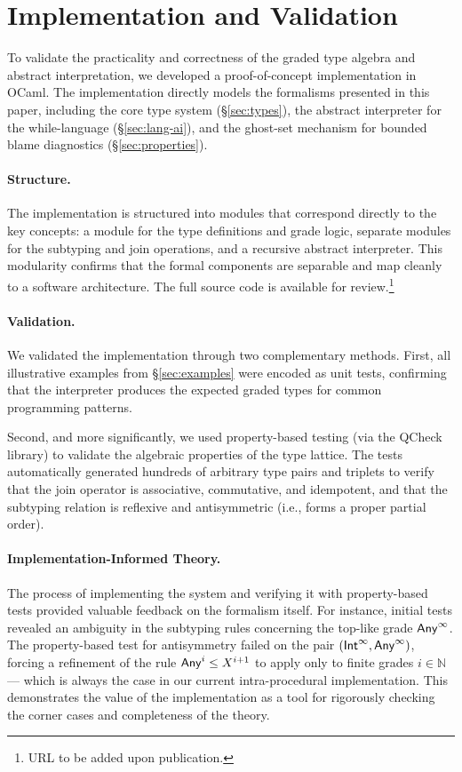 \section{Implementation and Validation}
\label{sec:implementation}

To validate the practicality and correctness of the graded type algebra and abstract interpretation, we developed a proof-of-concept implementation in OCaml. The implementation directly models the formalisms presented in this paper, including the core type system (\S\ref{sec:types}), the abstract interpreter for the \textsf{while}-language (\S\ref{sec:lang-ai}), and the ghost-set mechanism for bounded blame diagnostics (\S\ref{sec:properties}).

\paragraph{Structure.}
The implementation is structured into modules that correspond directly to the key concepts: a module for the type definitions and grade logic, separate modules for the subtyping and join operations, and a recursive abstract interpreter. This modularity confirms that the formal components are separable and map cleanly to a software architecture. The full source code is available for review.\footnote{URL to be added upon publication.}

\paragraph{Validation.}
We validated the implementation through two complementary methods. First, all illustrative examples from \S\ref{sec:examples} were encoded as unit tests, confirming that the interpreter produces the expected graded types for common programming patterns.

Second, and more significantly, we used property-based testing (via the QCheck library) to validate the algebraic properties of the type lattice. The tests automatically generated hundreds of arbitrary type pairs and triplets to verify that the join operator is associative, commutative, and idempotent, and that the subtyping relation is reflexive and antisymmetric (i.e., forms a proper partial order).

\paragraph{Implementation-Informed Theory.}
The process of implementing the system and verifying it with property-based tests provided valuable feedback on the formalism itself. For instance, initial tests revealed an ambiguity in the subtyping rules concerning the top-like grade $\mathsf{Any}^{\infty}$. The property-based test for antisymmetry failed on the pair $(\mathsf{Int}^{\infty}, \mathsf{Any}^{\infty})$, forcing a refinement of the rule $\mathsf{Any}^{i} \le X^{i+1}$ to apply only to finite grades $i \in \mathbb{N}$ --- which is always the case in our current intra-procedural implementation. This demonstrates the value of the implementation as a tool for rigorously checking the corner cases and completeness of the theory.

